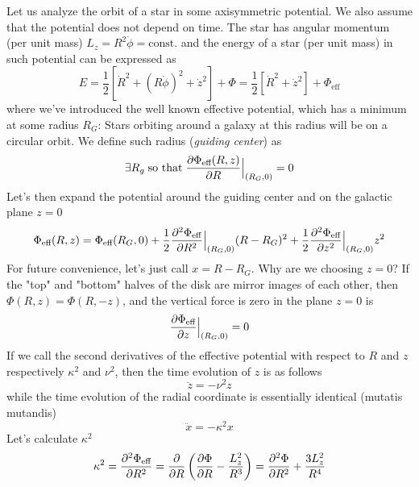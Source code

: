 Let us analyze the orbit of a star in some axisymmetric potential. We also assume that the potential does not depend on time. The star has angular momentum (per unit mass) $L_{z} = R^{2}\dot{\phi} = \text{const.}$ and the energy of a star (per unit mass) in such potential can be expressed as 
\begin{equation*}
    E = \frac{1}{2}\left[\dot{R}^{2}+(R\dot{\phi})^{2}+\dot{z}^{2}\right]+\Phi = \frac{1}{2}\left[\dot{R}^{2}+\dot{z}^{2}\right]+\Phi_{\text{eff}}
\end{equation*}
where we've introduced the well known effective potential, which has a minimum at some radius $R_{G}$: Stars orbiting around a galaxy at this radius will be on a circular orbit. We define such radius (\emph{guiding center}) as
\begin{equation}
    \exists R_{g}\;\text{so that} \; \frac{\partial \Phi_{\text{eff}}(R,z)}{\partial R}\Big|_{(R_{G},0)} = 0
    \label{eq:guidingcenter}
\end{equation}
Let's then expand the potential around the guiding center and on the galactic plane $z=0$
\begin{equation*}
    \Phi_{\text{eff}}(R,z) = \Phi_{\text{eff}}(R_{G},0)+\frac{1}{2}\frac{\partial^{2} \Phi_{\text{eff}}}{\partial R^{2}}\Big|_{(R_{G},0)}(R-R_{G})^{2}+\frac{1}{2}\frac{\partial^{2} \Phi_{\text{eff}}}{\partial z^{2}}\Big|_{(R_{G},0)}z^{2}
\end{equation*}
For future convenience, let's just call $x = R-R_{G}$. Why are we choosing $z=0$? If the "top" and "bottom" halves of the disk are mirror images of each other, then $\Phi(R,z) = \Phi(R,-z)$, and the vertical force is zero in the plane $z=0$ is 
\begin{equation*}
    \frac{\partial \Phi_{\text{eff}}}{\partial z}\Big|_{(R_{G},0)} = 0
\end{equation*}
If we call the second derivatives of the effective potential with respect to $R$ and $z$ respectively $\kappa^{2}$ and $\nu^{2}$, then the time evolution of $z$ is as follows
\begin{equation*}
    \ddot{z} = -\nu^{2}z
\end{equation*}
while the time evolution of the radial coordinate is essentially identical (mutatis mutandis)
\begin{equation*}
    \ddot{x} = -\kappa^{2}x
\end{equation*}
Let's calculate $\kappa^{2}$
\begin{equation*}
    \kappa^{2} = \frac{\partial^{2} \Phi_{\text{eff}}}{\partial R^{2}} = \frac{\partial}{\partial R}\left(\frac{\partial \Phi}{\partial R}-\frac{L_{z}^{2}}{R^{3}}\right) = \frac{\partial^{2} \Phi}{\partial R^{2}} + \frac{3L_{z}^{2}}{R^{4}}
\end{equation*}
